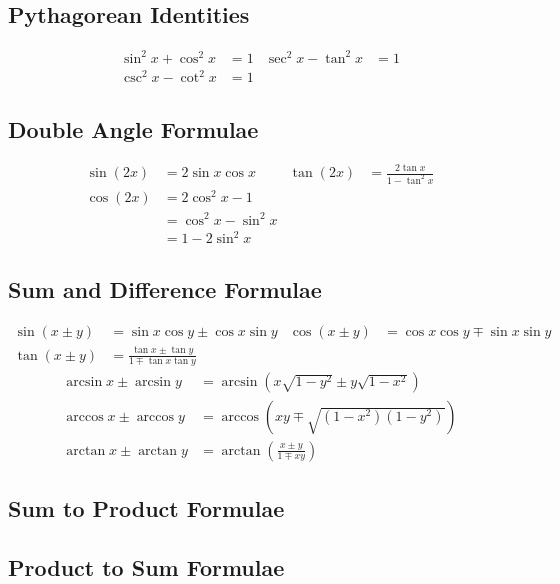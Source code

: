 \documentclass[12pt]{article}
\begin{document}
\subsection{Pythagorean Identities}

\begin{align*}
	\sin^2x + \cos^2x &= 1 &  \sec^2 x - \tan^2x &= 1 \\
	 \csc^2 x - \cot^2 x &= 1
\end{align*}

\subsection{Double Angle Formulae}
\begin{align*}
\sin{(2x)} &= 2\sin x\cos x & \tan{(2x)} &= \frac{2\tan x}{1 - \tan^2x} \\
\cos{(2x)} &= 2\cos^2x - 1 \\
&= \cos^2x - \sin^2x \\ &= 1 - 2\sin^2x
\end{align*}




\subsection{Sum and Difference Formulae}
\begin{align*}
\sin{(x \pm y)} &= \sin x\cos y \pm \cos x\sin y &
\cos{(x \pm y)} &= \cos x \cos y \mp \sin x \sin y \\
\tan{(x \pm y)} &= \frac{\tan x \pm \tan y}{1 \mp \tan x \tan y}
\end{align*}
\begin{align*}
\arcsin x \pm \arcsin y &= \arcsin{(x\sqrt{1 - y^2}\pm y\sqrt{1 - x^2})} \\ \arccos x \pm \arccos y &= \arccos{(xy \mp \sqrt{(1-x^2)(1-y^2)})} \\
\arctan x \pm \arctan y &= \arctan{(\frac{x\pm y}{1 \mp xy})}
\end{align*}

\subsection{Sum to Product Formulae}
\subsection{Product to Sum Formulae}
\end{document}
